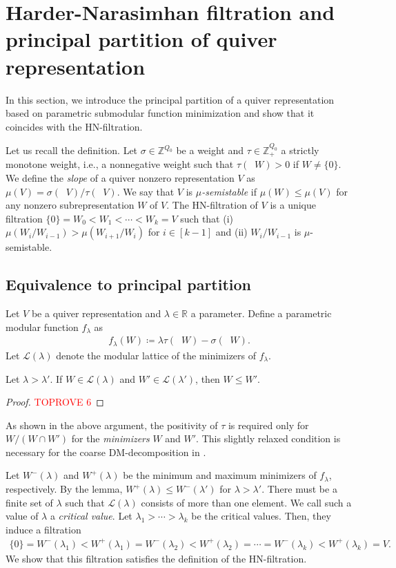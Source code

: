 \documentclass[a4paper,11pt]{article}
\numberwithin{equation}{section}
\newcommand{\R}{\mathbb{R}}
\newcommand{\Z}{\mathbb{Z}}
\newcommand{\caL}{\mathcal{L}}
\DeclareMathOperator{\dimv}{\underline{dim}}
\begin{document}
\section{Harder-Narasimhan filtration and principal partition of quiver representation}\label{sec:HN}
In this section, we introduce the principal partition of a quiver representation based on parametric submodular function minimization and show that it coincides with the HN-filtration.

Let us recall the definition.
Let $\sigma \in \Z^{Q_0}$ be a weight and $\tau \in \Z_+^{Q_0}$ a strictly monotone weight, i.e., a nonnegative weight such that $\tau(\dimv W) > 0$ if $W \neq \{0\}$.
We define the \emph{slope} of a quiver nonzero representation $V$ as $\mu(V) = \sigma(\dimv V)/\tau(\dimv V)$.
We say that $V$ is \emph{$\mu$-semistable} if $\mu(W) \leq \mu(V)$ for any nonzero subrepresentation $W$ of $V$.
The HN-filtration of $V$ is a unique filtration $\{0\} = W_0 < W_1 < \cdots < W_k = V$ such that (i) $\mu(W_i/W_{i-1}) > \mu(W_{i+1}/ W_i)$ for $i \in [k-1]$ and (ii) $W_i/W_{i-1}$ is $\mu$-semistable.

\subsection{Equivalence to principal partition}
Let $V$ be a quiver representation and $\lambda \in \R$ a parameter.
Define a parametric modular function $f_\lambda$ as
\begin{align}
    f_\lambda(W) \coloneqq \lambda \tau(\dimv W) - \sigma(\dimv W).
\end{align}
Let $\caL(\lambda)$ denote the modular lattice of the minimizers of $f_\lambda$.

\begin{lemma}
    Let $\lambda > \lambda'$. If $W \in \caL(\lambda)$ and $W' \in \caL(\lambda')$, then $W \leq W'$.
\end{lemma}
\begin{proof}\textcolor{red}{TOPROVE 6}\end{proof}

\begin{remark}\label{rem:strict-monotone}
    As shown in the above argument, the positivity of $\tau$ is required only for $W / (W \cap W')$ for the \emph{minimizers} $W$ and $W'$.
    This slightly relaxed condition is necessary for the coarse DM-decomposition in .
\end{remark}

Let $W^-(\lambda)$ and $W^+(\lambda)$ be the minimum and maximum minimizers of $f_\lambda$, respectively.
By the lemma, $W^+(\lambda) \leq W^-(\lambda')$ for $\lambda > \lambda'$.
There must be a finite set of $\lambda$ such that $\caL(\lambda)$ consists of more than one element.
We call such a value of $\lambda$ a \emph{critical value}.
Let $\lambda_1 > \cdots > \lambda_k$ be the critical values.
Then, they induce a filtration
\begin{align}
    \{0\} = W^-(\lambda_1) < W^+(\lambda_1) = W^-(\lambda_2) < W^+(\lambda_2) =  \cdots = W^-(\lambda_k) < W^+(\lambda_k) = V.
\end{align}
We show that this filtration satisfies the definition of the HN-filtration.
\end{document}

